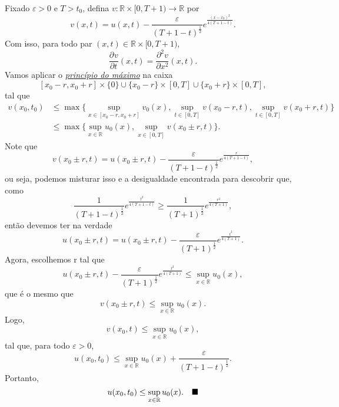 \documentclass[../pde_notes.tex]{subfiles}
\begin{document}
\begin{proof*}
\begin{proof*}[Lema]
		Fixado \(\varepsilon >0\) e \(T>t_{0}\), defina \(v:\mathbb{R}\times [0, T+1)\rightarrow \mathbb{R}\) por
		\[
			v(x, t ) = u(x, t) - \frac{\varepsilon }{(T+1-t)^{\frac{1}{2}}} e^{\frac{(x-x_{0})^{2}}{4(T+1-t)}}.
		\]
		Com isso, para todo par \((x, t)\in \mathbb{R}\times [0, T+1)\),
		\[
			\frac{\partial^{}v}{\partial t^{}}(x, t)=\frac{\partial^{2}v}{\partial x^{2}}(x, t).
		\]
		Vamos aplicar o \hyperlink{strong_maximum}{\textit{princípio do máximo}} na caixa
		\[
			[x_{0}-r, x_{0}+r] \times \{0\}\cup \{x_{0}-r\}\times [0, T]\cup \{x_{0}+r\}\times [0, T],
		\]
		tal que
		\begin{align*}
			v(x_{0}, t_{0}) & \leq \max\limits_{}\{\sup_{x\in [x_{0}-r, x_{0}+r]}v_{0}(x), \sup_{t\in [0, T]}v(x_{0}-r, t), \sup_{t\in [0, T]}v(x_{0}+r, t)\} \\
			                & \leq \max\limits_{}\{\sup_{x\in \mathbb{R}}u_{0}(x), \sup_{x\in [0, T]}v(x_{0}\pm r, t)\}.
		\end{align*}
		Note que
		\[
			v(x_{0}\pm r, t) = u(x_{0}\pm r, t) - \frac{\varepsilon }{(T+1-t)^{\frac{1}{2}}}e^{\frac{r}{4(T+1-t)}},
		\]
		ou seja, podemos misturar isso e a desigualdade encontrada para descobrir que, como
		\[
			\frac{1}{(T+1-t)^{\frac{1}{2}}}e^{\frac{t^{2}}{4(T+1-t)}}\geq \frac{1}{(T+1)^{\frac{1}{2}}}e^{\frac{r^{2}}{4(T+1)}},
		\]
		então devemos ter na verdade
		\[
			u(x_{0}\pm r, t) = u(x_{0}\pm r, t) - \frac{\varepsilon }{(T+1)^{\frac{1}{2}}}e^{\frac{t^{2}}{4(T+1)}}.
		\]
		Agora, escolhemos  r tal que
		\[
			u(x_{0}\pm r, t) - \frac{\varepsilon }{(T+1)^{\frac{1}{2}}}e^{\frac{t^{2}}{4(T+1)}}\leq \sup_{x\in \mathbb{R}}u_{0}(x),
		\]
		que é o mesmo que
		\[
			v(x_{0}\pm r, t) \leq \sup_{x\in \mathbb{R}} u_{0}(x).
		\]
		Logo,
		\[
			v(x_{0}, t) \leq \sup_{x\in \mathbb{R}}u_{0}(x),
		\]
		tal que, para todo \(\varepsilon  > 0\),
		\[
			u(x_{0}, t_{0})\leq \sup_{x\in \mathbb{R}} u_{0}(x) + \frac{\varepsilon }{(T+1-t)^{\frac{1}{2}}}.
		\]
		Portanto,
		\[
			u(x_{0}, t_{0}) \leq \sup_{x\in \mathbb{R}}u_{0}(x).\quad \text{$\blacksquare$}
		\]
	\end{proof*}


\end{proof*}
\end{document}
